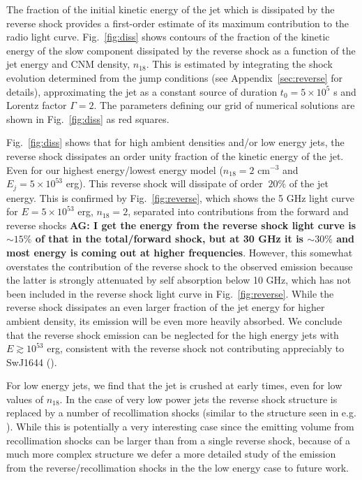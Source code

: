 \documentclass[usenatbib,fleqn]{mnras}
\begin{document}
The fraction of the initial kinetic energy of the jet which is
dissipated by the reverse shock provides a first-order estimate of its
maximum contribution to the radio light curve.  Fig.~\ref{fig:diss}
shows contours of the fraction of the kinetic energy of the slow
component dissipated by the reverse shock as a function of the jet
energy and CNM density, $n_{18}$.  This is estimated by integrating
the shock evolution determined from the jump conditions (see
Appendix~\ref{sec:reverse} for details), approximating the jet as a
constant source of duration $t_0 = 5 \times 10^{5}$ s and Lorentz
factor $\Gamma = 2$.  The parameters defining our grid of numerical
solutions are shown in Fig.~\ref{fig:diss} as red squares.


Fig.~\ref{fig:diss} shows that for high ambient densities and/or low
energy jets, the reverse shock dissipates an order unity fraction of
the kinetic energy of the jet.  Even for our highest energy/lowest
energy model ($n_{18}=2$ cm$^{-3}$ and $E_j=5\times 10^{53}$
erg). This reverse shock will dissipate of order $~20\%$ of the jet
energy.  This is confirmed by Fig.~\ref{fig:reverse}, which shows the
5 GHz light curve for $E = 5\times 10^{53}$ erg, $n_{18} = 2$,
separated into contributions from the forward and reverse shocks {\bf
  AG: I get the energy from the reverse shock light curve is $\sim
  15\%$ of that in the total/forward shock, but at 30 GHz it is
  $\sim30\%$ and most energy is coming out at higher frequencies}.
However, this somewhat overstates the contribution of the reverse
shock to the observed emission because the latter is strongly
attenuated by self absorption below 10 GHz, which has not been
included in the reverse shock light curve in Fig.~\ref{fig:reverse}.
While the reverse shock dissipates an even larger fraction of the jet
energy for higher ambient density, its emission will be even more
heavily absorbed.  We conclude that the reverse shock emission can be
neglected for the high energy jets with $E\gtrsim 10^{53}$ erg,
consistent with the reverse shock not contributing appreciably to
SwJ1644 (\citealt{Metzger+2012}).

For low energy jets, we find that the jet is crushed at early times,
even for low values of $n_{18}$. In the case of very low power jets
the reverse shock structure is replaced by a number of recollimation
shocks (similar to the structure seen in
e.g. \citealt{Mimica+2009}). While this is potentially a very
interesting case since the emitting volume from recollimation shocks
can be larger than from a single reverse shock, because of a much more
complex structure we defer a more detailed study of the emission from
the reverse/recollimation shocks in the the low energy case to future
work.
\end{document}
